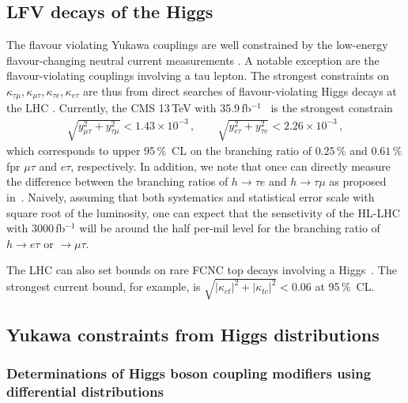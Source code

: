 \documentclass[../report.tex]{subfiles}
\begin{document}
\subsection{LFV decays of the Higgs}

The flavour violating Yukawa couplings are well constrained by the low-energy
flavour-changing neutral current measurements
\cite{Harnik:2012pb,Blankenburg:2012ex,Gorbahn:2014sha}. A notable
exception are the flavour-violating couplings involving a tau lepton. The
strongest constraints on $\kappa_{\tau\mu}, \kappa_{\mu\tau},
\kappa_{\tau e}, \kappa_{e \tau}$ are thus from direct searches of flavour-violating Higgs decays at
the LHC \cite{Sirunyan:2017xzt,Aad:2016blu}.
Currently, the CMS 13\,TeV with 35.9\,fb$^{-1}$~\cite{Sirunyan:2017xzt} is the strongest constrain 
%
\begin{align}
    \sqrt{y_{\mu\tau}^2 + y^2_{\tau\mu}} < 1.43 \times 10^{-3}\, , \qquad
    \sqrt{y_{e\tau}^2 + y^2_{\tau e}} < 2.26 \times 10^{-3}\, ,
\end{align}
%
which corresponds to upper 95\,\%~CL on the branching ratio of $0.25\,$\% and $0.61\,$\% fpr $\mu\tau$ and $e\tau$, respectively. In addition, we note that once can directly measure the difference between the branching ratios of $h\to\tau e$ and $h\to\tau\mu$ as proposed in~\cite{Bressler:2014jta}.
Naively, assuming that both systematics and statistical error scale with square root of the luminosity, one can expect that the sensetivity of the HL-LHC with $3000\,$fb$^{-1}$ will be  around the half per-mil level for the branching ratio of $h\to e\tau$ or $\to \mu\tau$. 


The LHC can also set bounds on rare FCNC top decays involving a Higgs~\cite{Aaboud:2017mfd,Khachatryan:2016atv,Aad:2015pja,Aad:2014dya}. The strongest current bound, for example, is $\sqrt{|\kappa_{ct}|^2+|\kappa_{tc}|^2}<0.06$ at 95\,\%~CL.

\subsection{Yukawa constraints from Higgs distributions}
\label{sec:HiggsDist}

\subsubsection{Determinations of Higgs boson coupling modifiers using differential distributions}
\end{document}
